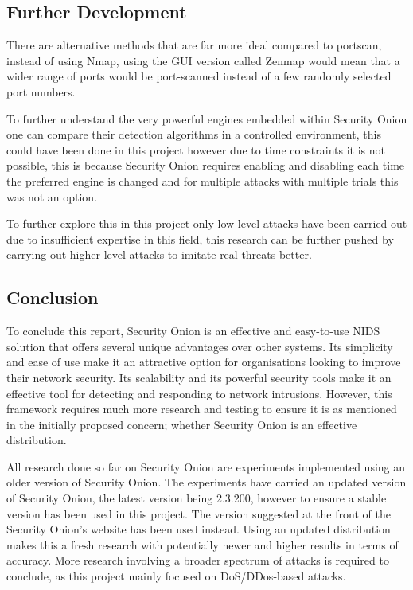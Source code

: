 \documentclass[12pt]{article}
\begin{document}
\subsection{Further Development}

There are alternative methods that are far more ideal compared to portscan, instead of using Nmap, using the GUI version called Zenmap would mean that a wider range of ports would be port-scanned instead of a few randomly selected port numbers. 

To further understand the very powerful engines embedded within Security Onion one can compare their detection algorithms in a controlled environment, this could have been done in this project however due to time constraints it is not possible, this is because Security Onion requires enabling and disabling each time the preferred engine is changed and for multiple attacks with multiple trials this was not an option.

To further explore this in this project only low-level attacks have been carried out due to insufficient expertise in this field, this research can be further pushed by carrying out higher-level attacks to imitate real threats better.

\subsection{Conclusion}

To conclude this report, Security Onion is an effective and easy-to-use NIDS solution that offers several unique advantages over other systems. Its simplicity and ease of use make it an attractive option for organisations looking to improve their network security. Its scalability and its powerful security tools make it an effective tool for detecting and responding to network intrusions. However, this framework requires much more research and testing to ensure it is as mentioned in the initially proposed concern; whether Security Onion is an effective distribution.

All research done so far on Security Onion are experiments implemented using an older version of Security Onion. The experiments have carried an updated version of Security Onion, the latest version being 2.3.200, however to ensure a stable version has been used in this project. The version suggested at the front of the Security Onion's website has been used instead. Using an updated distribution makes this a fresh research with potentially newer and higher results in terms of accuracy. More research involving a broader spectrum of attacks is required to conclude, as this project mainly focused on DoS/DDos-based attacks. 
\end{document}
